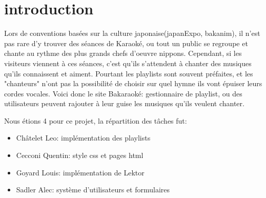 \section{introduction}
    Lors de conventions basées sur la culture japonaise(japanExpo, bakanim), il n'est pas rare d'y trouver des séances de Karaoké, ou tout un public se regroupe et chante au rythme des plus grands chefs d'oeuvre nippons.\newline
Cependant, si les visiteurs viennent à ces séances, c'est qu'ils s'attendent à chanter des musiques qu'ils connaissent et aiment. Pourtant les playlists sont souvent préfaites, et les "chanteurs" n'ont pas la possibilité de choisir sur quel hymne ils vont épuiser leurs cordes vocales. \newline
Voici donc le site Bakaraoké: gestionnaire de playlist, ou des utilisateurs peuvent rajouter à leur guise les musiques qu'ils veulent chanter. \newline

Nous étions 4 pour ce projet, la répartition des tâches fut:
\begin{itemize}
	\item Châtelet Leo: implémentation des playlists
	\item Cecconi Quentin: style css et pages html
	\item Goyard Louis: implémentation de Lektor
	\item Sadler Alec: système d'utilisateurs et formulaires
\end{itemize}
\newline



